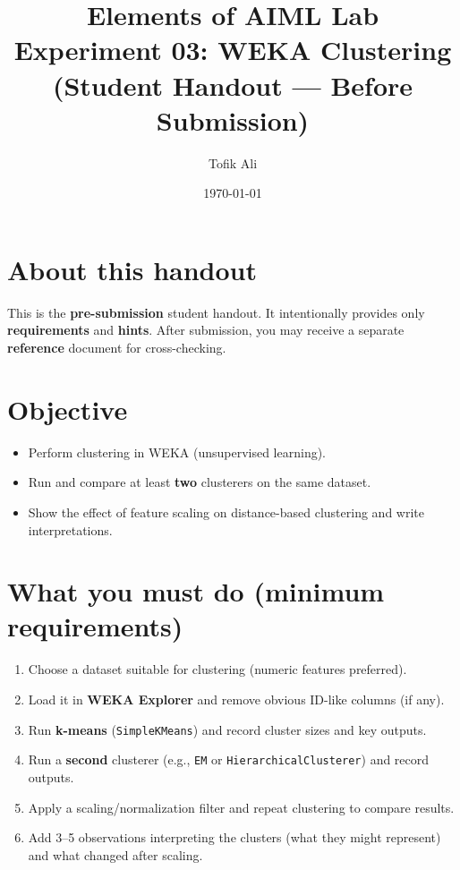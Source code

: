 \documentclass[11pt]{article}
\title{Elements of AIML Lab\\Experiment 03: WEKA Clustering (Student Handout — Before Submission)}
\author{Tofik Ali}
\date{\today}
\begin{document}
\maketitle
\tableofcontents

\section{About this handout}
This is the \textbf{pre-submission} student handout.
It intentionally provides only \textbf{requirements} and \textbf{hints}.
After submission, you may receive a separate \textbf{reference} document for cross-checking.

\section{Objective}
\begin{itemize}[leftmargin=*]
  \item Perform clustering in WEKA (unsupervised learning).
  \item Run and compare at least \textbf{two} clusterers on the same dataset.
  \item Show the effect of feature scaling on distance-based clustering and write interpretations.
\end{itemize}

\section{What you must do (minimum requirements)}
\begin{enumerate}[leftmargin=*]
  \item Choose a dataset suitable for clustering (numeric features preferred).
  \item Load it in \textbf{WEKA Explorer} and remove obvious ID-like columns (if any).
  \item Run \textbf{k-means} (\texttt{SimpleKMeans}) and record cluster sizes and key outputs.
  \item Run a \textbf{second} clusterer (e.g., \texttt{EM} or \texttt{HierarchicalClusterer}) and record outputs.
  \item Apply a scaling/normalization filter and repeat clustering to compare results.
  \item Add 3--5 observations interpreting the clusters (what they might represent) and what changed after scaling.
\end{enumerate}
\end{document}
